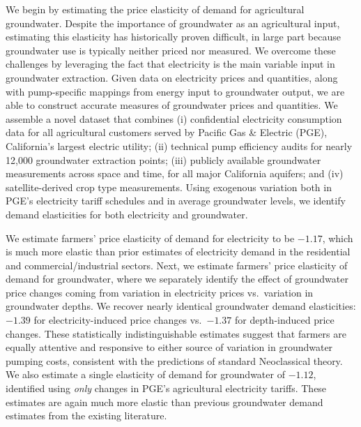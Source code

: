 We begin by estimating the price elasticity of demand for agricultural groundwater. %
Despite the importance of groundwater as an agricultural input, estimating this elasticity has historically proven difficult, in large  part because groundwater use is typically neither priced nor measured. 
We overcome these challenges by leveraging the fact that electricity is the main variable input in groundwater extraction. Given data on electricity prices and quantities, along with  pump-specific mappings from energy input to groundwater output, we are able to construct accurate measures of groundwater prices and quantities. We assemble a novel dataset that combines (i) confidential electricity consumption data for all agricultural customers served by Pacific Gas \& Electric (PGE), California's largest electric utility; (ii) technical pump efficiency audits for nearly 12,000 groundwater extraction points; (iii) publicly available groundwater measurements across space and time, for all major California aquifers; and (iv) satellite-derived crop type measurements.
Using exogenous variation both in PGE's electricity tariff schedules and in average groundwater levels, we identify demand elasticities for both electricity and groundwater.

We estimate farmers' price elasticity of demand for electricity to be $-1.17$, which is much more elastic than prior estimates of electricity demand in the residential and commercial/industrial sectors. Next, we estimate farmers' price elasticity of demand for groundwater, where we separately identify the effect of groundwater price changes coming from variation in electricity prices vs.\ variation in groundwater depths. We recover nearly identical groundwater demand elasticities: $-1.39$ for electricity-induced price changes vs.\ $-1.37$ for depth-induced price changes. These statistically indistinguishable estimates suggest that farmers are equally attentive and responsive to either source of variation in groundwater pumping costs, consistent with the predictions of standard Neoclassical theory. We also estimate a single elasticity of demand for groundwater of $-1.12$, identified using \emph{only} changes in PGE's agricultural electricity tariffs. These estimates are again much more elastic than previous groundwater demand estimates from the existing literature.%


